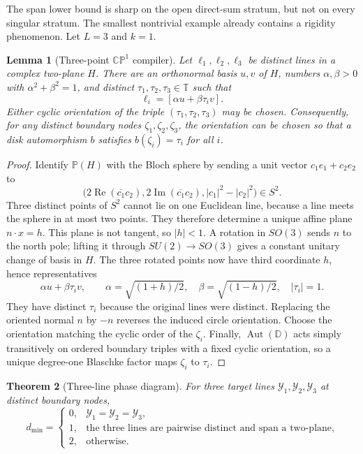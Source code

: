 \documentclass[11pt]{article}
\newtheorem{theorem}{Theorem}[section]
\newtheorem{lemma}[theorem]{Lemma}
\theoremstyle{definition}
\theoremstyle{remark}
\newcommand{\D}{\mathbb D}
\newcommand{\T}{\mathbb T}
\begin{document}
The span lower bound is sharp on the open direct-sum stratum, but not on every
singular stratum.  The smallest nontrivial example already contains a
rigidity phenomenon.  Let $L=3$ and $k=1$.

\begin{lemma}[Three-point $\mathbb{CP}^1$ compiler]
\label{lem:cp1-compiler}
Let $\ell_1,\ell_2,\ell_3$ be distinct lines in a complex two-plane $H$.
There are an orthonormal basis $u,v$ of $H$, numbers
$\alpha,\beta>0$ with $\alpha^2+\beta^2=1$, and distinct
$\tau_1,\tau_2,\tau_3\in\T$ such that
\begin{equation}\label{eq:latitude-normal-form}
                 \ell_i=[\alpha u+\beta\tau_i v].
\end{equation}
Either cyclic orientation of the triple $(\tau_1,\tau_2,\tau_3)$ may be
chosen.  Consequently, for any distinct boundary nodes
$\zeta_1,\zeta_2,\zeta_3$, the orientation can be chosen so that a disk
automorphism $b$ satisfies $b(\zeta_i)=\tau_i$ for all $i$.
\end{lemma}

\begin{proof}
Identify $\mathbb P(H)$ with the Bloch sphere by sending a unit vector
$c_1e_1+c_2e_2$ to
\[
 \bigl(2\operatorname{Re}(\overline{c_1}c_2),
       2\operatorname{Im}(\overline{c_1}c_2),
       |c_1|^2-|c_2|^2\bigr)\in S^2.
\]
Three distinct points of $S^2$ cannot lie on one Euclidean line, because a
line meets the sphere in at most two points.  They therefore determine a
unique affine plane $n\cdot x=h$.  This plane is not tangent, so $|h|<1$.
A rotation in $SO(3)$ sends $n$ to the north pole; lifting it through
$SU(2)\to SO(3)$ gives a constant unitary change of basis in $H$.  The three
rotated points now have third coordinate $h$, hence representatives
\[
       \alpha u+\beta\tau_i v,
 \qquad
       \alpha=\sqrt{(1+h)/2},\quad
       \beta=\sqrt{(1-h)/2},\quad |\tau_i|=1.
\]
They have distinct $\tau_i$ because the original lines were distinct.
Replacing the oriented normal $n$ by $-n$ reverses the induced circle
orientation.  Choose the orientation matching the cyclic order of the
$\zeta_i$.  Finally, $\operatorname{Aut}(\D)$ acts simply transitively on
ordered boundary triples with a fixed cyclic orientation, so a unique
degree-one Blaschke factor maps $\zeta_i$ to $\tau_i$.
\end{proof}

\begin{theorem}[Three-line phase diagram]\label{thm:three-lines}
For three target lines $\mathcal Y_1,\mathcal Y_2,\mathcal Y_3$ at distinct
boundary nodes,
\begin{equation}\label{eq:three-lines}
d_{\min}=
\begin{cases}
0,&\mathcal Y_1=\mathcal Y_2=\mathcal Y_3,\\
1,&\text{the three lines are pairwise distinct and span a two-plane},\\
2,&\text{otherwise}.
\end{cases}
\end{equation}
\end{theorem}
\end{document}
